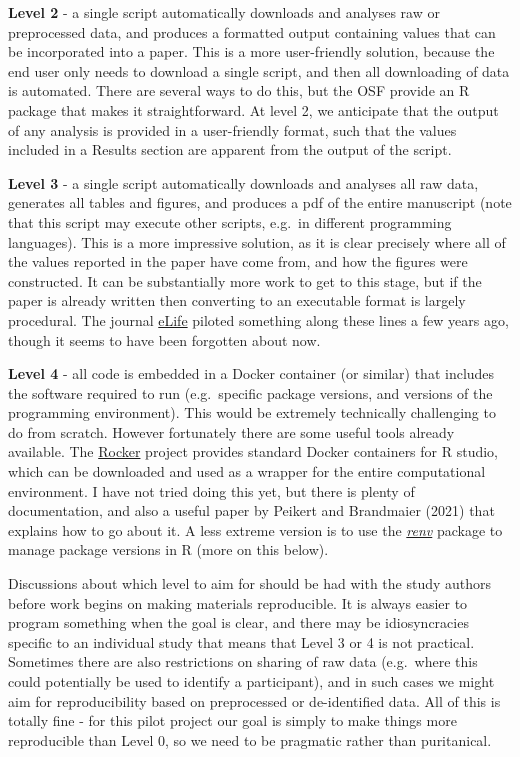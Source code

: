 \documentclass[
]{article}
\begin{document}
\textbf{Level 2} - a single script automatically downloads and analyses raw or preprocessed data, and produces a formatted output containing values that can be incorporated into a paper. This is a more user-friendly solution, because the end user only needs to download a single script, and then all downloading of data is automated. There are several ways to do this, but the OSF provide an R package that makes it straightforward. At level 2, we anticipate that the output of any analysis is provided in a user-friendly format, such that the values included in a Results section are apparent from the output of the script.

\textbf{Level 3} - a single script automatically downloads and analyses all raw data, generates all tables and figures, and produces a pdf of the entire manuscript (note that this script may execute other scripts, e.g.~in different programming languages). This is a more impressive solution, as it is clear precisely where all of the values reported in the paper have come from, and how the figures were constructed. It can be substantially more work to get to this stage, but if the paper is already written then converting to an executable format is largely procedural. The journal \href{https://elifesciences.org/}{eLife} piloted something along these lines a few years ago, though it seems to have been forgotten about now.

\textbf{Level 4} - all code is embedded in a Docker container (or similar) that includes the software required to run (e.g.~specific package versions, and versions of the programming environment). This would be extremely technically challenging to do from scratch. However fortunately there are some useful tools already available. The \href{https://rocker-project.org/}{Rocker} project provides standard Docker containers for R studio, which can be downloaded and used as a wrapper for the entire computational environment. I have not tried doing this yet, but there is plenty of documentation, and also a useful paper by Peikert and Brandmaier (2021) that explains how to go about it. A less extreme version is to use the \href{https://rstudio.github.io/renv/articles/renv.html}{\emph{renv}} package to manage package versions in R (more on this below).

Discussions about which level to aim for should be had with the study authors before work begins on making materials reproducible. It is always easier to program something when the goal is clear, and there may be idiosyncracies specific to an individual study that means that Level 3 or 4 is not practical. Sometimes there are also restrictions on sharing of raw data (e.g.~where this could potentially be used to identify a participant), and in such cases we might aim for reproducibility based on preprocessed or de-identified data. All of this is totally fine - for this pilot project our goal is simply to make things more reproducible than Level 0, so we need to be pragmatic rather than puritanical.
\end{document}
